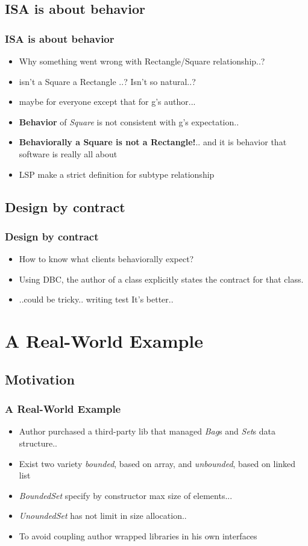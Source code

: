 \documentclass{beamer}
\begin{document}
\subsection{ISA is about behavior}
\begin{frame}
  \frametitle{ISA is about behavior}
  \begin{itemize}
	\item<+-> Why something went wrong with Rectangle/Square relationship..? 
	\item<+-> isn't a Square a Rectangle ..? Isn't so natural..?
	\item<+-> maybe for everyone except that for g's author...
	\item<+-> \textbf{Behavior} of \textit{Square} is not consistent with g's expectation.. 
	\item<+-> \textbf{Behaviorally a Square is not a Rectangle!}.. and it is behavior that software is really all about
	\item<+-> LSP make a strict definition for subtype relationship
   \end{itemize}
\end{frame}

\subsection{Design by contract}
\begin{frame}
  \frametitle{Design by contract}
  \begin{itemize}
	\item<+-> How to know what clients behaviorally expect?
	\item<+-> Using DBC, the author of a class explicitly states the contract for that class.
	\item<+-> ..could be tricky.. writing test It's better..
   \end{itemize}
\end{frame}

\section{A Real-World Example}
\subsection{Motivation}
\begin{frame}
  \frametitle{A Real-World Example}
  \begin{itemize}
	\item<+-> Author purchased a third-party lib that managed \textit{Bag}s and \textit{Set}s data structure..
	\item<+-> Exist two variety \textit{bounded}, based on array, and \textit{unbounded}, based on linked list
	\item<+-> \textit{BoundedSet} specify by constructor max size of elements...
	\item<+-> \textit{UnoundedSet} has not limit in size allocation..
	\item<+-> To avoid coupling author wrapped libraries in his own interfaces
   \end{itemize}
\end{frame}
\end{document}

